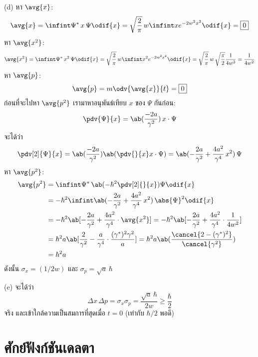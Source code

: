 \begin{soln}
    (d) หา $\avg{x}$:
    \[
        \avg{x} = \infint \Psi^*\,x\,\Psi \odif{x} = \sqrt{\frac{2}{\pi}}\,w \infint xe^{-2w^2x^2} \odif{x} = \boxed{0}
    \]
    หา $\avg{x^2}$:
    \[
        \avg{x^2} = \infint \Psi^*\,x^2\,\Psi \odif{x} = \sqrt{\frac{2}{\pi}}\,w \infint x^2e^{-2w^2x^2} \odif{x} = \sqrt{\frac{2}{\pi}}\,w\,\sqrt{\frac{\pi}{2}}\frac{1}{4w^3} = \frac{1}{4w^2}
    \]
    หา $\avg{p}$:
    \[
        \avg{p} = m\odv{\avg{x}}{t} = \boxed{0}
    \]
    ก่อนที่จะไปหา $\avg{p^2}$ เรามาหาอนุพันธ์เทียบ $x$ ของ $\Psi$ กันก่อน: 
    \[
        \pdv{\Psi}{x} = \ab(\frac{-2a}{\gamma^2})\,x\cdot\Psi
    \]
    จะได้ว่า
    \[
        \pdv[2]{\Psi}{x} = \ab(\frac{-2a}{\gamma^2})\ab(\pdv{}{x}x\cdot\Psi) = \ab(-\frac{2a}{\gamma^2} + \frac{4a^2}{\gamma^4}\,x^2)\,\Psi
    \]
    หา $\avg{p^2}$:
    \begin{align*}
        \avg{p^2} &= \infint \Psi^*\,\ab(-\hbar^2\pdv[2]{}{x})\Psi \odif{x} \\
        &= -\hbar^2 \infint \ab(-\frac{2a}{\gamma^2} + \frac{4a^2}{\gamma^4}\,x^2)\,\abs{\Psi}^2 \odif{x} \\
        &= -\hbar^2 \ab[-\frac{2a}{\gamma^2} + \frac{4a^2}{\gamma^4}\cdot\avg{x^2}] = -\hbar^2 \ab[-\frac{2a}{\gamma^2} + \frac{4a^2}{\gamma^4}\cdot\frac{1}{4w^2}] \\
        &= \hbar^2 a \ab[\frac{2}{\gamma^2} - \frac{a}{\gamma^4}\cdot\frac{(\gamma^*)^2\gamma^2}{a}] = \hbar^2 a \ab(\frac{\cancel{2 - (\gamma^*)^2}}{\cancel{\gamma^2}}) \\
        &= \hbar^2 a
    \end{align*}
    ดังนั้น $\boxed{\sigma_x = (1/2w)}$ และ $\boxed{\sigma_p = \sqrt{a}\,\hbar}$

    (e) จะได้ว่า
    \[
        \Delta x\,\Delta p = \sigma_x\sigma_p = \frac{\sqrt{a}\,\hbar}{2w} \geq \frac{\hbar}{2}
    \]
    จริง และเข้าใกล้ความเป็นสมการที่สุดเมื่อ $t = 0$ (เท่ากับ $\hbar/2$ พอดี)
\end{soln}

\section{ศักย์ฟังก์ชันเดลตา}